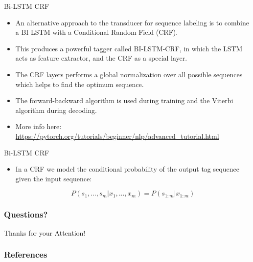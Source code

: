 \documentclass[handout]{beamer}
\begin{document}
\begin{frame}{Bi-LSTM CRF}
\begin{scriptsize}

\begin{itemize}

\item An alternative approach to the transducer for sequence labeling is to combine a BI-LSTM with a Conditional Random Field (CRF).
\item This produces a powerful tagger \cite{huang2015bidirectional} called BI-LSTM-CRF, in which the LSTM acts as feature extractor, and the CRF as a special layer.
\item The CRF layers performs a global normalization over all possible sequences which helps to find the optimum sequence.
\item The forward-backward algorithm is used during training and the Viterbi algorithm during decoding.

\item More info here: \url{https://pytorch.org/tutorials/beginner/nlp/advanced_tutorial.html}

\end{itemize}
\end{scriptsize}
\end{frame}



\begin{frame}{Bi-LSTM CRF}
\begin{scriptsize}

\begin{itemize}

\item In a CRF we model the conditional probability of the output tag sequence given the input sequence:

\begin{displaymath}
 P(s_1, \dots, s_m | x_1, \dots, x_m) = P(s_{1:m}|x_{1:m})
\end{displaymath}


\end{itemize}
\end{scriptsize}
\end{frame}



\begin{frame}
\frametitle{Questions?}
\begin{center}\LARGE Thanks for your Attention!\\ \end{center}



\end{frame}

\begin{frame}[allowframebreaks]\scriptsize
\frametitle{References}


%
\end{frame}  


\end{document}
